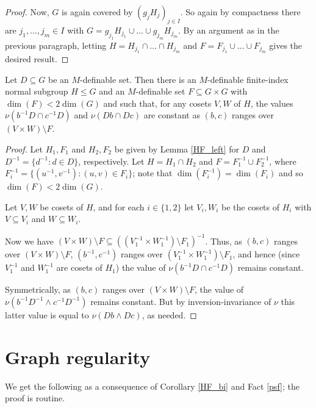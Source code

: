 \documentclass[10pt]{article}
\begin{document}
{\begin{proof}
    Now, $G$ is again covered by $(g_jH_j)_{j\in I}$. So again by compactness there are $j_1,\dots,j_m\in I$ with $G=g_{j_1}H_{j_1}\cup\dots\cup g_{j_m}H_{j_m}$. By an argument as in the previous paragraph, letting $H=H_{j_1}\cap\dots\cap H_{j_m}$ and $F=F_{j_1}\cup\dots\cup F_{j_m}$ gives the desired result.
\end{proof}

\begin{corollary}\label{HF_bi}
    Let $D\subseteq G$ be an $M$-definable set. Then there is an $M$-definable finite-index normal subgroup $H\leqslant G$ and an $M$-definable set $F\subseteq G\times G$ with $\dim(F)<2\dim(G)$ and such that, for any cosets $V,W$ of $H$, the values $\nu(b^{-1}D\cap c^{-1}D)$ and $\nu(Db\cap Dc)$ are constant as $(b,c)$ ranges over $(V\times W)\setminus F$.
\end{corollary}

\begin{proof}
    Let $H_1,F_1$ and $H_2,F_2$ be given by Lemma \ref{HF_left} for $D$ and $D^{-1}=\{d^{-1}:d\in D\}$, respectively. Let $H=H_1\cap H_2$ and $F=F_1^{-1}\cup F_2^{-1}$, where $F_i^{-1}=\{(u^{-1},v^{-1}):(u,v)\in F_i\}$; note that $\dim(F_i^{-1})=\dim(F_i)$ and so $\dim(F)<2\dim(G)$.

    
    
    Let $V,W$ be cosets of $H$, and for each $i\in\{1,2\}$ let $V_i,W_i$ be the cosets of $H_i$ with $V\subseteq V_i$ and $W\subseteq W_i$.
    
    Now we have $(V\times W)\setminus F\subseteq ((V_1^{-1}\times W_1^{-1})\setminus F_1)^{-1}$. Thus, as $(b,c)$ ranges over $(V\times W)\setminus F$, $(b^{-1},c^{-1})$ ranges over $(V_1^{-1}\times W_1^{-1})\setminus F_1$, and hence (since $V_1^{-1}$ and $W_1^{-1}$ are cosets of $H_1$) the value of $\nu(b^{-1}D\cap c^{-1}D)$ remains constant.

    Symmetrically, as $(b,c)$ ranges over $(V\times W)\setminus F$, the value of $\nu(b^{-1}D^{-1}\wedge c^{-1}D^{-1})$ remains constant. But by inversion-invariance of $\nu$ this latter value is equal to $\nu(Db\wedge Dc)$, as needed.
\end{proof}


\section{Graph regularity}
We get the following as a consequence of Corollary \ref{HF_bi} and Fact \ref{psf}; the proof is routine.

}
\end{document}
